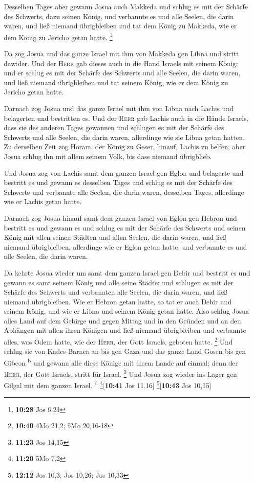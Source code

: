  Desselben Tages aber gewann Josua auch Makkeda und
schlug es mit der Schärfe des Schwerts, dazu seinen König, und verbannte
es und alle Seelen, die darin waren, und ließ niemand übrigbleiben und
tat dem König zu Makkeda, wie er dem König zu Jericho getan hatte.
\footnote{\textbf{10:28} Jos 6,21}

 Da zog Josua und das ganze Israel mit ihm von Makkeda
gen Libna und stritt dawider.  Und der \textsc{Herr} gab
dieses auch in die Hand Israels mit seinem König; und er schlug es mit
der Schärfe des Schwerts und alle Seelen, die darin waren, und ließ
niemand übrigbleiben und tat seinem König, wie er dem König zu Jericho
getan hatte.

 Darnach zog Josua und das ganze Israel mit ihm von Libna
nach Lachis und belagerten und bestritten es.  Und der
\textsc{Herr} gab Lachis auch in die Hände Israels, dass sie des anderen
Tages gewannen und schlugen es mit der Schärfe des Schwerts und alle
Seelen, die darin waren, allerdinge wie sie Libna getan hatten.
 Zu derselben Zeit zog Horam, der König zu Geser, hinauf,
Lachis zu helfen; aber Josua schlug ihn mit allem seinem Volk, bis dass
niemand übrigblieb.

 Und Josua zog von Lachis samt dem ganzen Israel gen
Eglon und belagerte und bestritt es  und gewann es
desselben Tages und schlug es mit der Schärfe des Schwerts und verbannte
alle Seelen, die darin waren, desselben Tages, allerdinge wie er Lachis
getan hatte.

 Darnach zog Josua hinauf samt dem ganzen Israel von
Eglon gen Hebron und bestritt es  und gewann es und
schlug es mit der Schärfe des Schwerts und seinen König mit allen seinen
Städten und allen Seelen, die darin waren, und ließ niemand
übrigbleiben, allerdinge wie er Eglon getan hatte, und verbannte es und
alle Seelen, die darin waren.

 Da kehrte Josua wieder um samt dem ganzen Israel gen
Debir und bestritt es  und gewann es samt seinem König
und alle seine Städte; und schlugen es mit der Schärfe des Schwerts und
verbannten alle Seelen, die darin waren, und ließ niemand übrigbleiben.
Wie er Hebron getan hatte, so tat er auch Debir und seinem König, und
wie er Libna und seinem König getan hatte.  Also schlug
Josua alles Land auf dem Gebirge und gegen Mittag und in den Gründen und
an den Abhängen mit allen ihren Königen und ließ niemand übrigbleiben
und verbannte alles, was Odem hatte, wie der \textsc{Herr}, der Gott
Israels, geboten hatte. \footnote{\textbf{10:40} 4Mo 21,2; 5Mo 20,16-18}
 Und schlug sie von Kades-Barnea an bis gen Gaza und das
ganze Land Gosen bis gen Gibeon \textsuperscript{b}  und
gewann alle diese Könige mit ihrem Lande auf einmal; denn der
\textsc{Herr}, der Gott Israels, stritt für Israel. \footnote{\textbf{11:23}
  Jos 14,15}  Und Josua zog wieder ins Lager gen Gilgal
mit dem ganzen Israel. \textsuperscript{d} \footnote{\textbf{11:20} 5Mo
  7,2}{[}\textbf{10:41} Jos 11,16{]} \footnote{\textbf{12:12} Jos 10,3;
  Jos 10,26; Jos 10,33}{[}\textbf{10:43} Jos 10,15{]}

